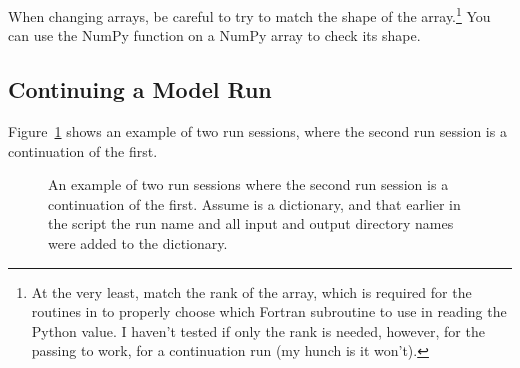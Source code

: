 When changing arrays, be careful to try to match the shape of the 
array.\footnote%
	{At the very least, match the rank of the array, which is required
	for the routines in  to properly choose which
	Fortran subroutine to use in reading the Python value.
	I haven't tested if only the rank is needed, however,
	for the passing to work, for a continuation run (my hunch is
	it won't).}
You can use the NumPy  function on a NumPy array to
check its shape.


	\subsection{Continuing a Model Run}  \label{sec:continuation.intro}

Figure~\ref{fig:continuation.example} shows an example of two run
sessions, where the second run session is a continuation of the
first.


\begin{latexonly}
\begin{figure}[htp]
\begin{codeblock}
\end{codeblock}

\caption{An example of two  run sessions where the second
	run session is a continuation of the first.  Assume 
	 is a dictionary, and that earlier in the
	script the run name and
	all input and output directory names were added
	to the dictionary.}
\label{fig:continuation.example}
\end{figure}
\end{latexonly}

